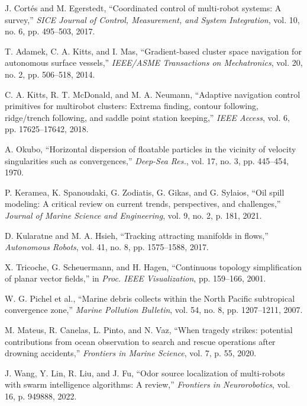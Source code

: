 
 J. Cortés and M. Egerstedt, ``Coordinated control of multi-robot systems: A survey,'' \textit{SICE Journal of Control, Measurement, and System Integration}, vol. 10, no. 6, pp. 495--503, 2017.

 T. Adamek, C. A. Kitts, and I. Mas, ``Gradient-based cluster space navigation for autonomous surface vessels,'' \textit{IEEE/ASME Transactions on Mechatronics}, vol. 20, no. 2, pp. 506--518, 2014.

 C. A. Kitts, R. T. McDonald, and M. A. Neumann, ``Adaptive navigation control primitives for multirobot clusters: Extrema finding, contour following, ridge/trench following, and saddle point station keeping,'' \textit{IEEE Access}, vol. 6, pp. 17625--17642, 2018.

 A. Okubo, ``Horizontal dispersion of floatable particles in the vicinity of velocity singularities such as convergences,'' \textit{Deep-Sea Res.}, vol. 17, no. 3, pp. 445--454, 1970.

 P. Keramea, K. Spanoudaki, G. Zodiatis, G. Gikas, and G. Sylaios, ``Oil spill modeling: A critical review on current trends, perspectives, and challenges,'' \textit{Journal of Marine Science and Engineering}, vol. 9, no. 2, p. 181, 2021.

 D. Kularatne and M. A. Hsieh, ``Tracking attracting manifolds in flows,'' \textit{Autonomous Robots}, vol. 41, no. 8, pp. 1575--1588, 2017.

 X. Tricoche, G. Scheuermann, and H. Hagen, ``Continuous topology simplification of planar vector fields,'' in \textit{Proc. IEEE Visualization}, pp. 159--166, 2001.

 W. G. Pichel et al., ``Marine debris collects within the North Pacific subtropical convergence zone,'' \textit{Marine Pollution Bulletin}, vol. 54, no. 8, pp. 1207--1211, 2007.

 M. Mateus, R. Canelas, L. Pinto, and N. Vaz, ``When tragedy strikes: potential contributions from ocean observation to search and rescue operations after drowning accidents,'' \textit{Frontiers in Marine Science}, vol. 7, p. 55, 2020.

 J. Wang, Y. Lin, R. Liu, and J. Fu, ``Odor source localization of multi-robots with swarm intelligence algorithms: A review,'' \textit{Frontiers in Neurorobotics}, vol. 16, p. 949888, 2022.

